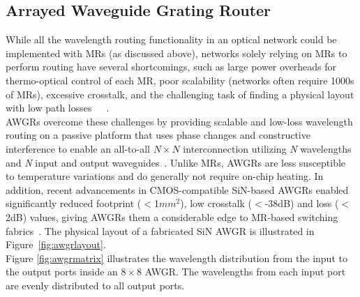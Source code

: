 \subsection{Arrayed Waveguide Grating Router}\label{sec:awgr}
While all the wavelength routing functionality in an optical network could be implemented with MRs (as discussed above), networks solely relying on MRs to perform routing have several shortcomings, such as large power overheads for thermo-optical control of each MR, poor scalability (networks often require 1000s of MRs), excessive crosstalk, and the challenging task of finding a physical layout with low path losses~\cite{ramini2013contrasting}~\cite{boos2013proton}~\cite{hamedani2014qut}.\\
AWGRs overcome these challenges by providing scalable and low-loss wavelength routing on a passive platform that uses phase changes and constructive interference to enable an all-to-all $N \times N$ interconnection utilizing \textit{N} wavelengths and \textit{N} input and output waveguides~\cite{grani2017design}. Unlike MRs, AWGRs are less susceptible to temperature variations and do generally not require on-chip heating. 
In addition, recent advancements in CMOS-compatible SiN-based AWGRs enabled significantly reduced footprint ($<$1$mm^2$), low crosstalk ($<$-38dB) and loss ($<$2dB) values, giving AWGRs them a considerable edge to MR-based switching fabrics~\cite{shang2017low}. The physical layout of a fabricated SiN AWGR is illustrated in Figure~\ref{fig:awgrlayout}. \\
Figure \ref{fig:awgrmatrix} illustrates the wavelength distribution from the input to the output ports inside an $8\times 8$ AWGR. The wavelengths from each input port are evenly distributed to all output ports. 
